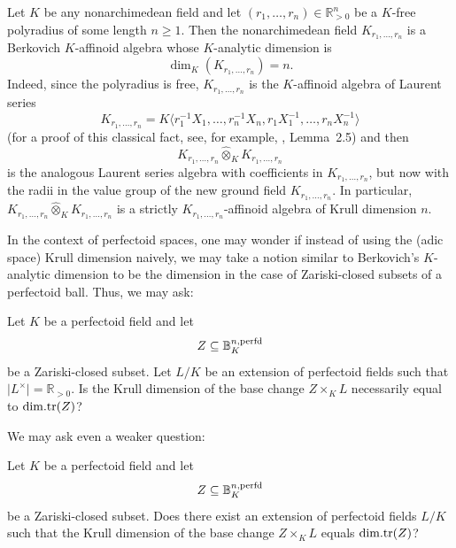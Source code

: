 \begin{example}Let $K$ be any nonarchimedean field and let $(r_1,\dots, r_n)\in \mathbb{R}_{>0}^{n}$ be a $K$-free polyradius of some length $n\geq1$. Then the nonarchimedean field $K_{r_1,\dots, r_n}$ is a Berkovich $K$-affinoid algebra whose $K$-analytic dimension is \begin{equation*}\dim_{K}(K_{r_1,\dots, r_n})=n.\end{equation*}Indeed, since the polyradius is free, $K_{r_1,\dots, r_n}$ is the $K$-affinoid algebra of Laurent series \begin{equation*}K_{r_1,\dots, r_n}=K\langle r_{1}^{-1}X_{1},\dots, r_{n}^{-1}X_{n}, r_{1}X_{1}^{-1},\dots, r_{n}X_{n}^{-1}\rangle\end{equation*}(for a proof of this classical fact, see, for example, \cite{Dine-Garzella25}, Lemma~2.5) and then \begin{equation*}K_{r_1,\dots, r_n}\widehat{\otimes}_{K}K_{r_1,\dots, r_n}\end{equation*}is the analogous Laurent series algebra with coefficients in $K_{r_1,\dots, r_n}$, but now with the radii in the value group of the new ground field $K_{r_1,\dots, r_n}$. In particular, $K_{r_1,\dots, r_n}\widehat{\otimes}_{K}K_{r_1,\dots, r_n}$ is a strictly $K_{r_1,\dots, r_n}$-affinoid algebra of Krull dimension $n$.\end{example}
In the context of perfectoid spaces, 
one may wonder if instead of using the (adic space) Krull dimension naively,
we may take a notion similar to Berkovich's $K$-analytic dimension to be the dimension in the case of Zariski-closed subsets of a perfectoid ball. Thus, we may ask:

\begin{quest}
    Let \(K\) be a perfectoid field and let \begin{equation*}Z\subseteq \mathbb{B}_{K}^{n,\operatorname{perfd}}\end{equation*}be a Zariski-closed subset. Let $L/K$ be an extension of perfectoid fields such that $\vert L^{\times}\vert=\mathbb{R}_{>0}$. 
    Is the Krull dimension of the base change $Z\times_{K}L$ necessarily equal to \(\mathrm{dim.tr}(Z)\)?
\end{quest}

We may ask even a weaker question:

\begin{quest}
    Let \(K\) be a perfectoid field and let \begin{equation*}Z\subseteq \mathbb{B}_{K}^{n,\operatorname{perfd}}\end{equation*}be a Zariski-closed subset. Does there exist an extension of perfectoid fields $L/K$ such that the Krull dimension of the base change $Z\times_{K}L$ equals $\mathrm{dim.tr}(Z)$? 
\end{quest}







